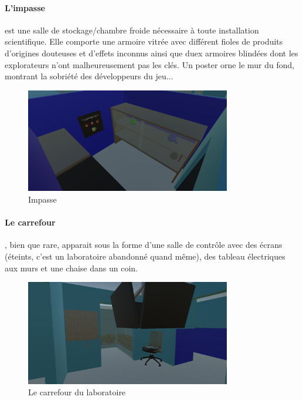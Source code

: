\documentclass{article}
\begin{document}
\paragraph{L'impasse}\hspace{-0.2cm}est une salle de stockage/chambre froide nécessaire à toute installation scientifique. Elle comporte une armoire vitrée avec différent fioles de produits d'origines douteuses et d'effets inconnus ainsi que duex armoires blindées dont les explorateurs n'ont malheureusement pas les clés. Un poster orne le mur du fond, montrant la sobriété des développeurs du jeu...

\begin{figure}[!ht]
    \centering
    \includegraphics[width=0.8\textwidth]{impasse.png}
    \caption{Impasse}
    \label{Impasse}
\end{figure}

\newpage
\paragraph{Le carrefour}\hspace{-0.2cm}, bien que rare, apparait sous la forme d'une salle de contrôle avec des écrans (éteints, c'est un laboratoire abandonné quand même), des tableau électriques aux murs et une chaise dans un coin.

\begin{figure}[!ht]
    \centering
    \includegraphics[width=0.8\textwidth]{carrefour.png}
    \caption{Le carrefour du laboratoire}
    \label{carrefour}
\end{figure}
\end{document}
